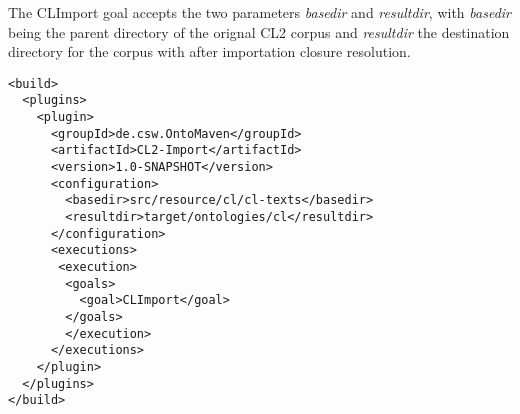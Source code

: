\documentclass{IOS-Book-Article}
\begin{document}
The CLImport goal accepts the two parameters \emph{basedir} and \emph{resultdir}, with \emph{basedir} being the parent directory of the orignal CL2 corpus and \emph{resultdir} the destination directory for the corpus with after importation closure resolution.
 
\begin{verbatim}
<build>
  <plugins>
    <plugin>
      <groupId>de.csw.OntoMaven</groupId>
      <artifactId>CL2-Import</artifactId>
      <version>1.0-SNAPSHOT</version>
      <configuration>
        <basedir>src/resource/cl/cl-texts</basedir>
        <resultdir>target/ontologies/cl</resultdir>
      </configuration>
      <executions>
       <execution>
        <goals>
          <goal>CLImport</goal>
        </goals>
        </execution>
      </executions>	
    </plugin>
  </plugins>
</build>
\end{verbatim}
\end{document}
